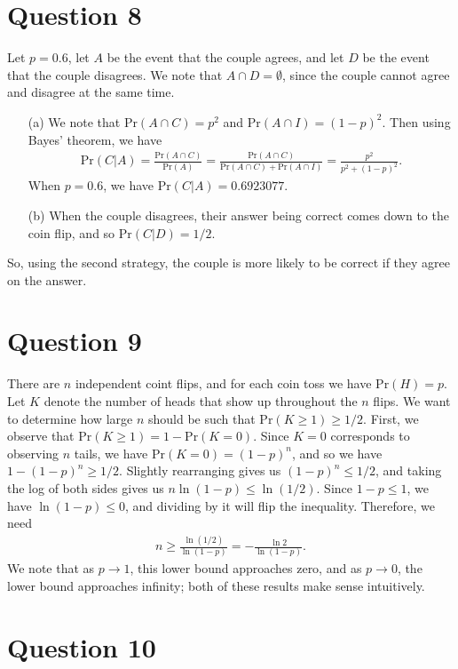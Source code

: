 \documentclass[10pt]{article}
\begin{document}
\section{Question 8} \noindent
Let \(p = 0.6\), let \(A\) be the event that the couple agrees, and let \(D\) be the event that the couple disagrees. We note that \(A \cap D = \emptyset\), 
since the couple cannot agree and disagree at the same time. 
\begin{itemize}
    \item[(a)] We note that \(\mathrm{Pr}(A \cap C) = p^2\) and \(\mathrm{Pr}(A \cap I) = (1-p)^2\). Then using Bayes' theorem, we have 
    \begin{align*}
        \mathrm{Pr}(C | A) = \frac{\mathrm{Pr}(A \cap C)}{\mathrm{Pr}(A)} = \frac{\mathrm{Pr}(A \cap C)}{\mathrm{Pr}(A \cap C) + \mathrm{Pr}(A \cap I)} 
        = \frac{p^2}{p^2 + (1-p)^2}.
    \end{align*}
    When \(p = 0.6\), we have \(\mathrm{Pr}(C | A) = 0.6923077\).
    \item[(b)] When the couple disagrees, their answer being correct comes down to the coin flip, and so \(\mathrm{Pr}(C | D) = 1/2\). 
\end{itemize}
So, using the second strategy, the couple is more likely to be correct if they agree on the answer. 

\section{Question 9} \noindent
There are \(n\) independent coint flips, and for each coin toss we have \(\mathrm{Pr}(H) = p\). Let \(K\) denote the number of heads that show up throughout
the \(n\) flips. We want to determine how large \(n\) should be such that \(\mathrm{Pr}(K \ge 1) \ge 1/2\). First, we observe that \(\mathrm{Pr}(K \ge 1) = 
1 - \mathrm{Pr}(K = 0)\). Since \(K = 0\) corresponds to observing \(n\) tails, we have \(\mathrm{Pr}(K = 0) = (1-p)^n\), and so we have 
\(1 - (1-p)^n \ge 1/2\). Slightly rearranging gives us \((1-p)^n \le 1/2\), and taking the log of both sides gives us \(n \ln(1 - p) \le \ln(1/2)\). Since 
\(1 - p \le 1\), we have \(\ln(1-p) \le 0\), and dividing by it will flip the inequality. Therefore, we need 
\begin{align*}
    n \ge \frac{\ln(1/2)}{\ln(1-p)} = - \frac{\ln 2}{\ln (1-p)}.
\end{align*}
We note that as \(p \to 1\), this lower bound approaches zero, and as \(p \to 0\), the lower bound approaches infinity; 
both of these results make sense intuitively. 

\section{Question 10} \noindent
\end{document}
